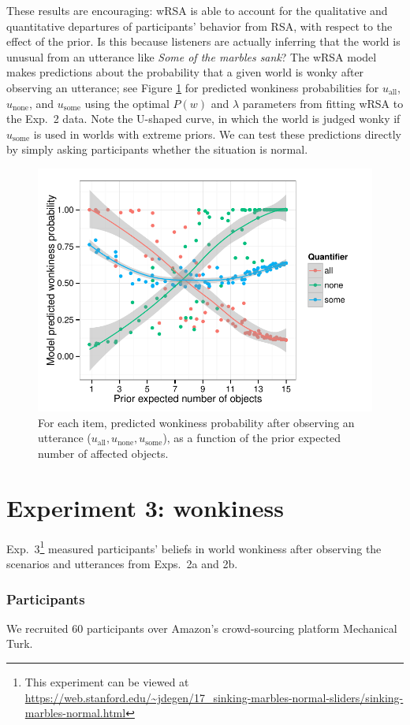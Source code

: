 \documentclass[10pt,letterpaper]{article}
\newcommand{\figref}[1]{Figure \ref{#1}}
\begin{document}
These results are encouraging: wRSA is able to account for the qualitative and quantitative departures of participants' behavior from RSA, with respect to the effect of the prior.
Is this because listeners are actually inferring that the world is unusual from an utterance like \emph{Some of the marbles sank}?
The wRSA model makes predictions about the probability that a given world is wonky after observing an utterance; see \figref{fig:wonkymodel} for predicted wonkiness probabilities for $u_{\textrm{all}}$, $u_{\textrm{none}}$, and $u_{\textrm{some}}$ using the  optimal $P(w)$ and $\lambda$ parameters from fitting wRSA to the Exp.~2 data.
Note the U-shaped curve, in which the world is judged wonky if $u_{\textrm{some}}$ is used in worlds with extreme priors.
 We can test these predictions directly by simply asking participants whether the situation is normal.



\begin{figure}
	\includegraphics[width=.5\textwidth]{pics/model-wonkiness-uniform}
	\caption{For each item, predicted wonkiness probability after observing an utterance ($u_{\textrm{all}}, u_{\textrm{none}}, u_{\textrm{some}}$), as a function of the prior expected number of affected objects.}
	\label{fig:wonkymodel}	
\end{figure}

\section{Experiment 3: wonkiness}

Exp.~3\footnote{This experiment can be viewed at \url{https://web.stanford.edu/~jdegen/17_sinking-marbles-normal-sliders/sinking-marbles-normal.html}} measured participants' beliefs in world wonkiness after observing the scenarios and utterances from Exps.~2a and 2b.

\subsubsection{Participants}
We recruited 60 participants over Amazon's crowd-sourcing platform Mechanical Turk.
\end{document}
